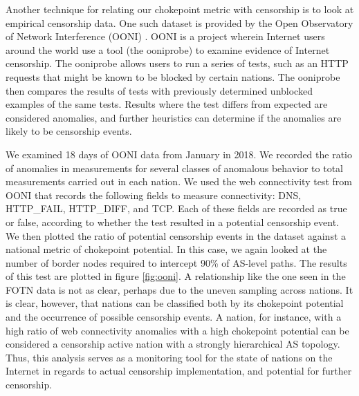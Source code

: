\documentclass{article}
\begin{document}
\begin{multicols}{2}
Another
technique for relating our chokepoint metric with censorship is to look at
empirical censorship data. One such dataset is provided by the Open
Observatory of Network Interference (OONI) \cite{OONI}. OONI is a project
wherein Internet users around the world use a tool (the ooniprobe) to examine
evidence of Internet censorship. The ooniprobe allows users to run a series of
tests, such as an HTTP requests that might be known to be blocked by certain
nations. The ooniprobe then compares the results of tests with previously
determined unblocked examples of the same tests. Results where the test
differs from expected are considered anomalies, and further heuristics can
determine if the anomalies are likely to be censorship events.
\par We examined
18 days of OONI data from January in 2018. We recorded the ratio of anomalies
in measurements for several classes of anomalous behavior to total
measurements carried out in each nation. We used the web connectivity test
from OONI that records the following fields to measure connectivity: DNS,
HTTP\_FAIL, HTTP\_DIFF, and TCP. Each of these fields are recorded as true or
false, according to whether the test resulted in a potential censorship event.
We then plotted the ratio of potential censorship events in the dataset
against a national metric of chokepoint potential. In this case, we again
looked at the number of border nodes required to intercept 90\% of AS-level
paths. The results of this test are plotted in figure \ref{fig:ooni}. A
relationship like the one seen in the FOTN data is not as clear, perhaps due
to the uneven sampling across nations. It is clear, however, that nations can
be classified both by its chokepoint potential and the occurrence of possible
censorship events. A nation, for instance, with a high ratio of web
connectivity anomalies with a high chokepoint potential can be considered a
censorship active nation with a strongly hierarchical AS topology. Thus, this
analysis serves as a monitoring tool for the state of nations on the Internet
in regards to actual censorship implementation, and potential for further
censorship.


\end{multicols}
\end{document}
